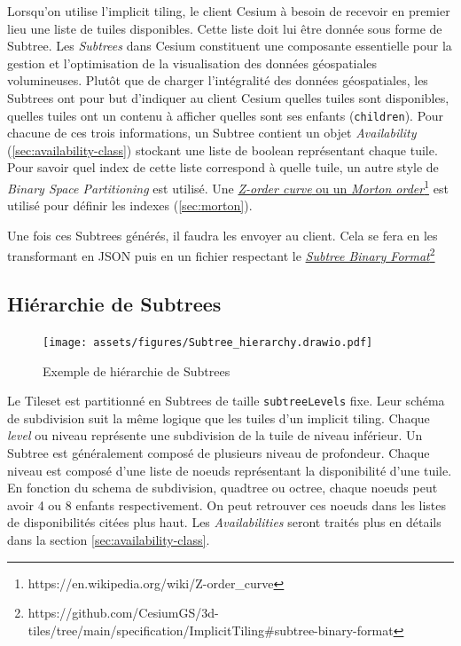 Lorsqu'on utilise l'implicit tiling, le client Cesium à besoin de recevoir en premier lieu une liste de tuiles disponibles. Cette liste doit lui être donnée sous forme de Subtree. Les \textit{Subtrees} dans Cesium constituent une composante essentielle pour la gestion et l'optimisation de la visualisation des données géospatiales volumineuses. Plutôt que de charger l'intégralité des données géospatiales, les Subtrees ont pour but d'indiquer au client Cesium quelles tuiles sont disponibles, quelles tuiles ont un contenu à afficher quelles sont ses enfants (\texttt{children}). Pour chacune de ces trois informations, un Subtree contient un objet \textit{Availability} (\autoref{sec:availability-class}) stockant une liste de boolean représentant chaque tuile. Pour savoir quel index de cette liste correspond à quelle tuile, un autre style de \textit{Binary Space Partitioning} est utilisé. Une \href{https://en.wikipedia.org/wiki/Z-order\_curve}{\textit{Z-order curve} ou un \textit{Morton order}}\footnote{https://en.wikipedia.org/wiki/Z-order\_curve} est utilisé pour définir les indexes (\autoref{sec:morton}).

Une fois ces Subtrees générés, il faudra les envoyer au client. Cela se fera en les transformant en JSON puis en un fichier respectant le \href{https://github.com/CesiumGS/3d-tiles/tree/main/specification/ImplicitTiling\#subtree-binary-format}{\textit{Subtree Binary Format}}\footnote{https://github.com/CesiumGS/3d-tiles/tree/main/specification/ImplicitTiling\#subtree-binary-format}

\subsection*{Hiérarchie de Subtrees}

\begin{figure}[H]
    \centering
    \texttt{[image: assets/figures/Subtree\_hierarchy.drawio.pdf]}
    \caption{Exemple de hiérarchie de Subtrees}
    \label{fig:subtree-hierarchy}
\end{figure}

Le Tileset est partitionné en Subtrees de taille \texttt{subtreeLevels} fixe. Leur schéma de subdivision suit la même logique que les tuiles d'un implicit tiling. Chaque \textit{level} ou niveau représente une subdivision de la tuile de niveau inférieur. Un Subtree est généralement composé de plusieurs niveau de profondeur. Chaque niveau est composé d'une liste de noeuds représentant la disponibilité d'une tuile. En fonction du schema de subdivision, quadtree ou octree, chaque noeuds peut avoir 4 ou 8 enfants respectivement. On peut retrouver ces noeuds dans les listes de disponibilités citées plus haut. Les \textit{Availabilities} seront traités plus en détails dans la section \ref{sec:availability-class}.

